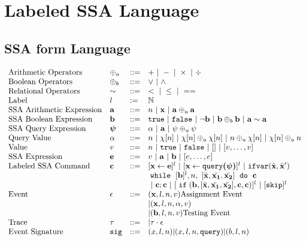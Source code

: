 \section{Labeled SSA Language}
%
%
\subsection{SSA form Language}
\[
\begin{array}{llll}
 \mbox{Arithmetic Operators} 
& \oplus_a & ::= & + ~|~ - ~|~ \times 
%
~|~ \div \\  
\mbox{Boolean Operators} 
& \oplus_b & ::= & \lor ~|~ \land
\\
\mbox{Relational Operators} 
& \sim & ::= & < ~|~ \leq ~|~ == 
\\  
%
\mbox{Label} 
& l & := & \mathbb{N} 
\\ 
%
\mbox{SSA Arithmetic Expression} 
& \saexpr & ::= & 
n ~|~ \ssa{x} ~|~ \saexpr \oplus_a \saexpr  
\\
%
\mbox{SSA Boolean Expression} & \sbexpr & ::= & 
	\etrue ~|~ \efalse  ~|~ \neg \sbexpr
	 ~|~ \sbexpr \oplus_b \sbexpr
	~|~ \saexpr \sim \saexpr 
	\\
%
\mbox{SSA Query Expression} 
& \ssa{\qexpr} & ::= 
& { \qval ~|~ \saexpr ~|~ \qexpr \oplus_a \qexpr} 
\\
%
\mbox{Query Value} & \qval & ::= 
& {n ~|~ \chi[n] ~|~ \chi[n] \oplus_a  \chi[n] ~|~ n \oplus_a  \chi[n]
~|~ \chi[n] \oplus_a  n}
\\
%
\mbox{Value} 
& v & ::= & { n \sep \etrue \sep \efalse ~|~ [] ~|~ [v, \dots, v]}  
\\
%
\mbox{SSA Expression} & \sexpr & ::= & v ~|~ \saexpr \sep \sbexpr ~|~ [\expr, \dots, \expr]
\\	
%
\mbox{Labeled SSA Command} 
& \ssa{c} & ::= &   [\assign {\ssa{x}}{ \ssa{\expr}}]^{l} ~|~  [\assign {\ssa{x} } {\ssa{\query(\qexpr)}}]^{l}
%
~|~  {{\eifvar(\bar{\ssa{x}}, \bar{\ssa{x}}')}} 
%
\\ 
&&& 
{\ewhile ~ [ \sbexpr ]^{l} , n,
~ 
[\bar{\ssa{x}}, \bar{\ssa{x_1}}, \bar{\ssa{x_2}}] 
~ \edo ~  \ssa{c} }
\\
&&&
~|~ \ssa{c};\ssa{c}  
~|~ [\eif(\sbexpr, [\bar{\ssa{x}}, \bar{\ssa{x_1}}, \bar{\ssa{x_2}}] , \ssa{c}, \ssa{c})]^l 
~|~ [\eskip]^{l} 
\\
%
\mbox{Event} 
& \event & ::= & 
      (\ssa{x}, l, n, v)   \mbox{Assignment Event} \\
&&& | (\ssa{x}, l, n, \qval, v) \\
&&& | (\sbexpr, l, n, v) \mbox{Testing Event}
\\
%
\mbox{Trace} & \vtrace
& ::= & | \vtrace \cdot \event
\\
%
\mbox{Event Signature} & \sig
& ::= & (x, l, n) | (x, l, n, \query) | (b, l, n)
\end{array}
\]
